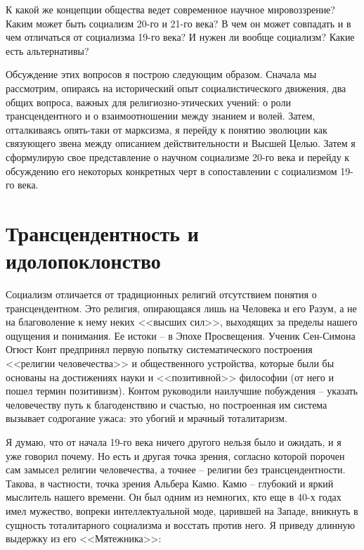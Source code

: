 \documentclass{book}
\begin{document}
К какой же концепции общества ведет современное научное мировоззрение? Каким может быть социализм 20-го и 21-го века? В чем он может совпадать и в чем отличаться от социализ­ма 19-го века? И нужен ли вообще социализм? Какие есть аль­тернативы?

Обсуждение этих вопросов я построю следующим образом. Сначала мы рассмотрим, опираясь на исторический опыт социалистического движения, два общих вопроса, важных для религиозно-этических учений: о роли трансцендентного и о взаимоотношении между знанием и волей. Затем, отталкиваясь опять-таки от марксизма, я перейду к понятию эволюции как связующего звена между описанием действительности и Высшей Целью. Затем я сформулирую свое представление о научном социализме 20-го века и перейду к обсуждению его некоторых конкретных черт в сопоставлении с социализмом 19-го века.



\section{Трансцендентность и идолопоклонство}

Социализм отличается от традиционных религий отсутствием понятия о трансцендентном. Это религия, опирающаяся лишь на Человека и его Разум, а не на благоволение к нему неких <<высших сил>>, выходящих за пределы нашего ощущения и понимания. Ее истоки -- в Эпохе Просвещения. Ученик Сен-Симона Огюст Конт предпринял первую попытку системати­ческого построения <<религии человечества>> и общественного устройства, которые были бы основаны на достижениях науки и <<позитивной>> философии (от него и пошел термин позитивизм).  Контом руководили наилучшие побуждения -- указать человечеству путь к благоденствию и счастью, но построенная им система вызывает содрогание ужаса: это убогий и мрачный тоталитаризм.

Я думаю, что от начала 19-го века ничего другого нельзя было и ожидать, и я уже говорил почему. Но есть и другая точка зрения, согласно которой порочен сам замысел религии человечества, а точнее -- религии без трансцендентности. Такова, в частности, точка зрения Альбера Камю. Камю -- глубокий и яркий мыслитель нашего времени. Он был одним из немногих, кто еще в 40-х годах имел мужество, вопреки интеллектуальной моде, царившей на Западе, вникнуть в сущность тоталитарного социализма и восстать против него. Я приведу длинную выдержку из его <<Мятежника>>:
\end{document}
